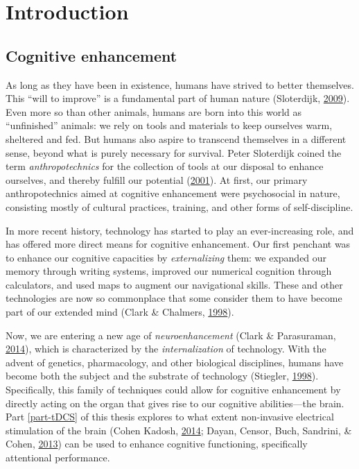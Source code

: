 \documentclass[12pt,a4paper,]{memoir}
\begin{document}
\hypertarget{intro-general}{%
\chapter{Introduction}\label{intro-general}}

\hypertarget{cognitive-enhancement}{%
\section{Cognitive enhancement}\label{cognitive-enhancement}}

As long as they have been in existence, humans have strived to better themselves. This ``will to improve'' is a fundamental part of human nature (Sloterdijk, \protect\hyperlink{ref-Sloterdijk2009}{2009}). Even more so than other animals, humans are born into this world as ``unfinished'' animals: we rely on tools and materials to keep ourselves warm, sheltered and fed. But humans also aspire to transcend themselves in a different sense, beyond what is purely necessary for survival. Peter Sloterdijk coined the term \emph{anthropotechnics} for the collection of tools at our disposal to enhance ourselves, and thereby fulfill our potential (\protect\hyperlink{ref-Sloterdijk2001}{2001}). At first, our primary anthropotechnics aimed at cognitive enhancement were psychosocial in nature, consisting mostly of cultural practices, training, and other forms of self-discipline.

In more recent history, technology has started to play an ever-increasing role, and has offered more direct means for cognitive enhancement. Our first penchant was to enhance our cognitive capacities by \emph{externalizing} them: we expanded our memory through writing systems, improved our numerical cognition through calculators, and used maps to augment our navigational skills. These and other technologies are now so commonplace that some consider them to have become part of our extended mind (Clark \& Chalmers, \protect\hyperlink{ref-Clark1998}{1998}).

Now, we are entering a new age of \emph{neuroenhancement} (Clark \& Parasuraman, \protect\hyperlink{ref-Clark2014}{2014}), which is characterized by the \emph{internalization} of technology. With the advent of genetics, pharmacology, and other biological disciplines, humans have become both the subject and the substrate of technology (Stiegler, \protect\hyperlink{ref-Stiegler1998}{1998}). Specifically, this family of techniques could allow for cognitive enhancement by directly acting on the organ that gives rise to our cognitive abilities---the brain. Part \ref{part-tDCS} of this thesis explores to what extent non-invasive electrical stimulation of the brain (Cohen Kadosh, \protect\hyperlink{ref-CohenKadosh2014}{2014}; Dayan, Censor, Buch, Sandrini, \& Cohen, \protect\hyperlink{ref-Dayan2013}{2013}) can be used to enhance cognitive functioning, specifically attentional performance.
\end{document}
